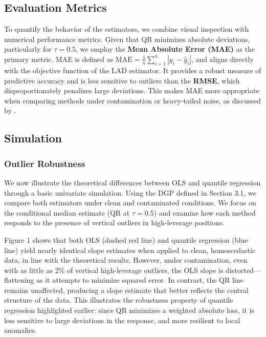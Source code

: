 \documentclass[fleqn,10pt]{latex/stylish_article} %
\begin{document}
\subsection{Evaluation Metrics}\label{evaluation-metrics}

To quantify the behavior of the estimators, we combine visual inspection with numerical performance metrics. Given that QR minimizes absolute deviations, particularly for \(\tau = 0.5\), we employ the \textbf{Mean Absolute Error (MAE)} as the primary metric. MAE is defined as \(\text{MAE} = \frac{1}{n} \sum_{i=1}^n |y_i - \hat{y}_i|\), and aligns directly with the objective function of the LAD estimator. It provides a robust measure of predictive accuracy and is less sensitive to outliers than the \textbf{RMSE}, which disproportionately penalizes large deviations. This makes MAE more appropriate when comparing methods under contamination or heavy-tailed noise, as discussed by \citet{Koenker2005}.

\subsection{Simulation}\label{simulation}

\subsubsection{Outlier Robustness}\label{outlier-robustness}

We now illustrate the theoretical differences between OLS and quantile regression through a basic univariate simulation. Using the DGP defined in Section 3.1, we compare both estimators under clean and contaminated conditions. We focus on the conditional median estimate (QR at \(\tau = 0.5\)) and examine how each method responds to the presence of vertical outliers in high-leverage positions.

Figure 1 shows that both OLS (dashed red line) and quantile regression (blue line) yield nearly identical slope estimates when applied to clean, homoscedastic data, in line with the theoretical results. However, under contamination, even with as little as 2\% of vertical high-leverage outliers, the OLS slope is distorted---flattening as it attempts to minimize squared error. In contrast, the QR line remains unaffected, producing a slope estimate that better reflects the central structure of the data. This illustrates the robustness property of quantile regression highlighted earlier: since QR minimizes a weighted absolute loss, it is less sensitive to large deviations in the response, and more resilient to local anomalies.
\end{document}
